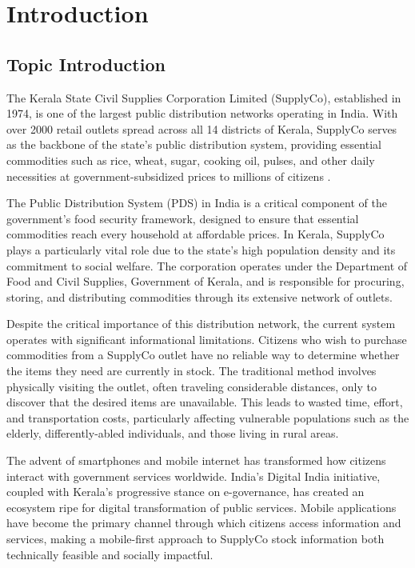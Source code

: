 \chapter{Introduction}

\section{Topic Introduction}

The Kerala State Civil Supplies Corporation Limited (SupplyCo), established in 1974, is one of the largest public distribution networks operating in India. With over 2000 retail outlets spread across all 14 districts of Kerala, SupplyCo serves as the backbone of the state's public distribution system, providing essential commodities such as rice, wheat, sugar, cooking oil, pulses, and other daily necessities at government-subsidized prices to millions of citizens \cite{supplyco_official}.

The Public Distribution System (PDS) in India is a critical component of the government's food security framework, designed to ensure that essential commodities reach every household at affordable prices. In Kerala, SupplyCo plays a particularly vital role due to the state's high population density and its commitment to social welfare. The corporation operates under the Department of Food and Civil Supplies, Government of Kerala, and is responsible for procuring, storing, and distributing commodities through its extensive network of outlets.

Despite the critical importance of this distribution network, the current system operates with significant informational limitations. Citizens who wish to purchase commodities from a SupplyCo outlet have no reliable way to determine whether the items they need are currently in stock. The traditional method involves physically visiting the outlet, often traveling considerable distances, only to discover that the desired items are unavailable. This leads to wasted time, effort, and transportation costs, particularly affecting vulnerable populations such as the elderly, differently-abled individuals, and those living in rural areas.

The advent of smartphones and mobile internet has transformed how citizens interact with government services worldwide. India's Digital India initiative, coupled with Kerala's progressive stance on e-governance, has created an ecosystem ripe for digital transformation of public services. Mobile applications have become the primary channel through which citizens access information and services, making a mobile-first approach to SupplyCo stock information both technically feasible and socially impactful.

